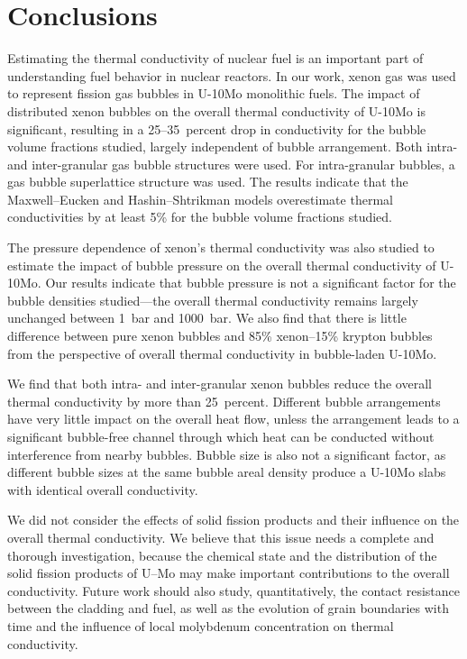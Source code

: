 \section{\label{sec:conclusion}Conclusions}
Estimating the thermal conductivity of nuclear fuel is an important part of understanding fuel behavior in nuclear reactors. In our work, xenon gas was used to represent fission gas bubbles in \mbox{U-10Mo} monolithic fuels. The impact of distributed xenon bubbles on the overall thermal conductivity of \mbox{U-10Mo} is significant, resulting in a 25--35~percent drop in conductivity for the bubble volume fractions studied, largely independent of bubble arrangement. Both intra- and inter-granular gas bubble structures were used. For intra-granular bubbles, a gas bubble superlattice structure was used. The results indicate that the Maxwell--Eucken and Hashin--Shtrikman models overestimate thermal conductivities by at least 5\% for the bubble volume fractions studied.

The pressure dependence of xenon's thermal conductivity was also studied to estimate the impact of bubble pressure on the overall thermal conductivity of \mbox{U-10Mo}. Our results indicate that bubble pressure is not a significant factor for the bubble densities studied---the overall thermal conductivity remains largely unchanged between 1~bar and 1000~bar.
We also find that there is little difference between pure xenon bubbles and
85\% xenon--15\% krypton bubbles from the perspective of overall thermal
conductivity in bubble-laden \mbox{U-10Mo}.

We find that both intra- and inter-granular xenon bubbles reduce the overall thermal conductivity by more than 25~percent. Different bubble arrangements have very little impact on the overall heat flow, unless the arrangement leads to a significant bubble-free channel through which heat can be conducted without interference from nearby bubbles. Bubble size is also not a significant factor, as different bubble sizes at the same bubble areal density produce a U-10Mo slabs with identical overall conductivity.

{We did not consider the effects of solid
fission products and their influence on the overall thermal conductivity. We
believe that this issue needs a complete and thorough investigation, because the
chemical state and the distribution of the solid fission products of U--Mo may
make important contributions to the overall conductivity.}
Future work should also study, quantitatively, the contact resistance between
the cladding and fuel, as well as the evolution of grain boundaries with time
and the influence of local molybdenum concentration on thermal conductivity.




%


%
